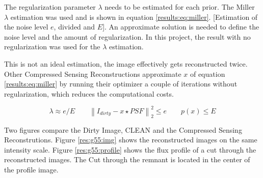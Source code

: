The regularization parameter $\lambda$ needs to be estimated for each prior. The Miller\cite{miller1970least} $\lambda$ estimation was used and is shown in equation \eqref{results:eq:miller}. [Estimation of the noise level $e$, divided and $E$]. An approximate solution is needed to define the noise level and the amount of regularization. In this project, the result with no regularization was used for the $\lambda$ estimation.

This is not an ideal estimation, the image effectively gets reconstructed twice. Other Compressed Sensing Reconstructions approximate $x$ of equation \eqref{results:eq:miller} by running their optimizer a couple of iterations without regularization, which reduces the computational costs. 

\begin{equation}\label{results:eq:miller}
	\lambda \approx e / E \qquad  \left \| I_{dirty} - x \star PSF \right \|_2^2 \le e \qquad p(x) \le E
\end{equation}

Two figures compare the Dirty Image, CLEAN and the Compressed Sensing Reconstrutions. Figure \ref{res:g55:img} shows the reconstructed images on the same intensity scale. Figure \ref{res:g55:profile} shows the flux profile of a cut through the reconstructed images. The Cut through the remnant is located in the center of the profile image.

